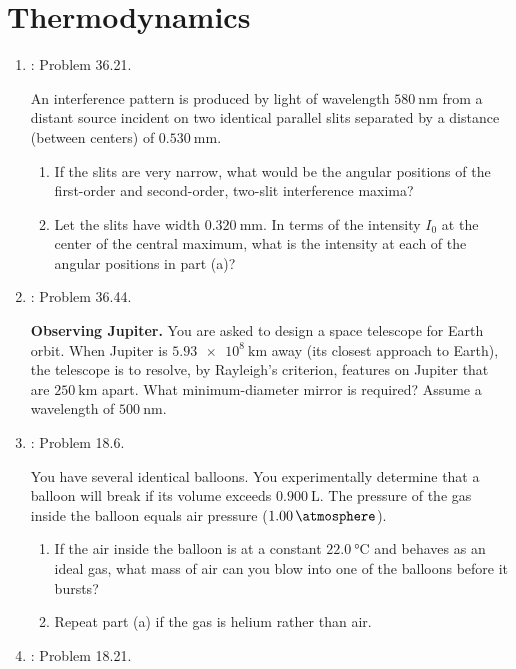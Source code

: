 \documentclass[../psets.tex]{subfiles}
\begin{document}
\section{Thermodynamics}
\begin{enumerate}[label={\arabic*)}]
    \item {}\textcite{bib:YoungFreedman}: Problem 36.21.\par
    An interference pattern is produced by light of wavelength $\SI{580}{\nano\meter}$ from a distant source incident on two identical parallel slits separated by a distance (between centers) of $\SI{0.530}{\milli\meter}$.
    \begin{enumerate}
        \item If the slits are very narrow, what would be the angular positions of the first-order and second-order, two-slit interference maxima?
        \item Let the slits have width $\SI{0.320}{\milli\meter}$. In terms of the intensity $I_0$ at the center of the central maximum, what is the intensity at each of the angular positions in part (a)?
    \end{enumerate}
    \item \textcite{bib:YoungFreedman}: Problem 36.44.\par
    \textbf{Observing Jupiter.} You are asked to design a space telescope for Earth orbit. When Jupiter is $\SI{5.93e8}{\kilo\meter}$ away (its closest approach to Earth), the telescope is to resolve, by Rayleigh's criterion, features on Jupiter that are $\SI{250}{\kilo\meter}$ apart. What minimum-diameter mirror is required? Assume a wavelength of $\SI{500}{\nano\meter}$.
    \item \textcite{bib:YoungFreedman}: Problem 18.6.\par
    You have several identical balloons. You experimentally determine that a balloon will break if its volume exceeds $\SI{0.900}{\liter}$. The pressure of the gas inside the balloon equals air pressure ($\SI{1.00}{\atmosphere}$).
    \begin{enumerate}
        \item If the air inside the balloon is at a constant $\SI{22.0}{\celsius}$ and behaves as an ideal gas, what mass of air can you blow into one of the balloons before it bursts?
        \item Repeat part (a) if the gas is helium rather than air.
    \end{enumerate}
    \item \textcite{bib:YoungFreedman}: Problem 18.21.\par

\end{enumerate}
\end{document}
